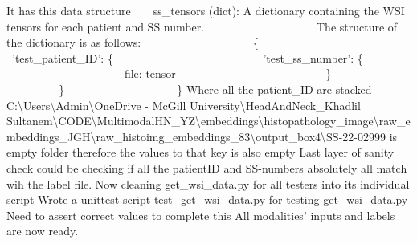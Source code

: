 \documentclass{article}%
\begin{document}
\newline%
\newline%
%
It has this data structure %
\newline%
\newline%
%
~ ~ ss\_tensors (dict): A dictionary containing the WSI tensors for each patient and SS number.%
\newline%
\newline%
%
~ ~ ~ ~ ~ ~ ~ ~ ~ ~ ~ ~The structure of the dictionary is as follows:%
\newline%
\newline%
%
~ ~ ~ ~ ~ ~ ~ ~ ~ ~ ~ ~\{%
\newline%
\newline%
%
~ ~ ~ ~ ~ ~ ~ ~ ~ ~ ~ ~ ~ ~'test\_patient\_ID': \{%
\newline%
\newline%
%
~ ~ ~ ~ ~ ~ ~ ~ ~ ~ ~ ~ ~ ~ ~ ~'test\_ss\_number': \{%
\newline%
\newline%
%
~ ~ ~ ~ ~ ~ ~ ~ ~ ~ ~ ~ ~ ~ ~ ~ ~ ~file: tensor%
\newline%
\newline%
%
~ ~ ~ ~ ~ ~ ~ ~ ~ ~ ~ ~ ~ ~ ~ ~\}%
\newline%
\newline%
%
~ ~ ~ ~ ~ ~ ~ ~ ~ ~ ~ ~ ~ ~\}%
\newline%
\newline%
%
~ ~ ~ ~ ~ ~ ~ ~ ~ ~ ~ ~\}%
\newline%
\newline%
%
Where all the patient\_ID are stacked %
\newline%
\newline%
%
C:\textbackslash{}Users\textbackslash{}Admin\textbackslash{}OneDrive {-} McGill University\textbackslash{}HeadAndNeck\_Khadlil Sultanem\textbackslash{}CODE\textbackslash{}MultimodalHN\_YZ\textbackslash{}embeddings\textbackslash{}histopathology\_image\textbackslash{}raw\_embeddings\_JGH\textbackslash{}raw\_histoimg\_embeddings\_83\textbackslash{}output\_box4\textbackslash{}SS{-}22{-}02999 is empty folder therefore the values to that key is also empty %
\newline%
\newline%
%
Last layer of sanity check could be checking if all the patientID and SS{-}numbers absolutely all match wih the label file. %
\newline%
\newline%
%
Now cleaning get\_wsi\_data.py for all testers into its individual script%
\newline%
\newline%
%
Wrote  a unittest script test\_get\_wsi\_data.py for testing get\_wsi\_data.py %
\newline%
\newline%
%
Need to assert correct values to complete this %
\newline%
\newline%
%
All modalities’ inputs and labels are now ready. %
\newline%
\newline%
%
\end{document}
